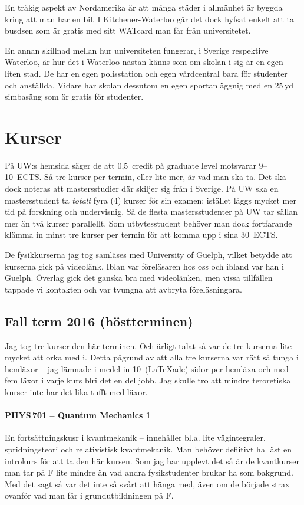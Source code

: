 \documentclass[11pt,a4paper, english, swedish]{article}
\begin{document}
En tråkig aspekt av Nordamerika är att många städer i allmänhet är
byggda kring att man har en bil. I Kitchener-Waterloo går det dock
hyfsat enkelt att ta busdsen som är gratis med sitt WATcard man får
från universitetet. 

En annan skillnad mellan hur universiteten fungerar, i Sverige
respektive Waterloo, är hur det i Waterloo nästan känns som om skolan
i sig är en egen liten stad. De har en egen polisstation och egen
vårdcentral bara för studenter och anställda. Vidare har skolan
dessutom en egen sportanläggnig med en 25\,yd simbasäng som är gratis
för studenter. 





\clearpage
\appendix
\section{Kurser}
På UW:s hemsida säger de att 0,5~credit på graduate level motsvarar
9--10~ECTS. Så tre kurser per termin, eller lite mer, är vad man ska
ta. Det ska dock noteras att mastersstudier där skiljer sig från i
Sverige. På UW ska en mastersstudent ta \emph{totalt} fyra (4) kurser
för sin examen; istället läggs mycket mer tid på forskning och
undervisnig. Så de flesta mastersstudenter på UW tar sällan mer än två
kurser parallellt. Som utbytesstudent behöver man dock fortfarande
klämma in minst tre kurser per termin för att komma upp i sina
30~ECTS. 

De fysikkurserna jag tog samläses med University of Guelph, vilket
betydde att kurserna gick på videolänk. Iblan var föreläsaren hos oss
och ibland var han i Guelph. Överlag gick det ganska bra med
videolänken, men vissa tillfällen tappade vi kontakten och var tvungna
att avbryta föreläsningara. 

\subsection{Fall term 2016 (höstterminen)}
Jag tog tre kurser den här terminen. Och ärligt talat så var de tre
kurserna lite mycket att orka med i. Detta pågrund av att alla tre
kurserna var rätt så tunga i hemläxor -- jag lämnade i medel in
10~(\LaTeX{}ade) sidor per hemläxa och med fem läxor i varje kurs blri det en del
jobb. Jag skulle tro att mindre teroretiska kurser inte har det lika
tufft med läxor.

\paragraph{PHYS\,701 -- Quantum Mechanics 1}
En fortsättningskusr i kvantmekanik -- innehåller bl.a. lite
vägintegraler, spridningsteori och relativistisk kvantmekanik. Man
behöver defiitivt ha läst en introkurs för att ta den här kursen. Som
jag har upplevt det så är de kvantkurser man tar på F lite mindre än
vad andra fysikstudenter brukar ha som bakgrund\footnotemark{}. Med
det sagt så var det inte så svårt att hänga med, även om de började
strax ovanför vad man får i grundutbildningen på F. 
\end{document}
